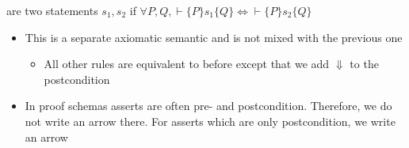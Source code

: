 \begin{itemize}
\begin{itemize}
                \begin{itemize}
                     are two statements $s_1, s_2$ if $\forall P, Q, \vdash \{P\} s_1 \{Q\} \iff \vdash \{P\} s_2 \{Q\}$
                \end{itemize}
        \end{itemize}
        \begin{itemize}
             If $P$ evaluates to true in the initial state $\sigma$ then the execution of $s$ from $\sigma$ terminates and $Q$ will evaluate to true in the final statement
             $\{P\} s \{\Downarrow Q\}$
                \begin{itemize}
                    \item Expression that evaluates to a value in a well-founded set before each iteration
                            \begin{itemize}
                                \item Normally we use $\N$
                            \end{itemize}
                    \item Each loop iteration must decrease the value of the invariant
                    \item Loop has to terminate once the minimal value of the well-founded set is reached
                    \item Used to prove termination
                \end{itemize}
            \item This is a separate axiomatic semantic and is not mixed with the previous one
                \begin{itemize}
                        \begin{itemize}
                            \item $\Inf[\text{WHTOT}_\text{Ax}][\mathtt{if} \ \ub{b} \wedge \ub{P} \models 0 \le \ub{e} \text{ and } Z \notin \ub{P}]{\{\ub{b} \wedge \ub{P} \wedge \ub{e} = Z\} \ub{s} \{\Downarrow \ub{P} \wedge \ub{e} < Z\}}{\{\ub{P}\} \texttt{while} \ \ub{b} \ \texttt{do} \ \ub{s} \ \texttt{end} \{\Downarrow \neg \ub{b} \wedge \ub{P}\}}$
                        \end{itemize}
                    \item All other rules are equivalent to before except that we add $\Downarrow$ to the postcondition
                \end{itemize}
            \item In proof schemas asserts are often pre- and postcondition. Therefore, we do not write an arrow there. For asserts which are only postcondition, we write an arrow
        \end{itemize}
\end{itemize}


